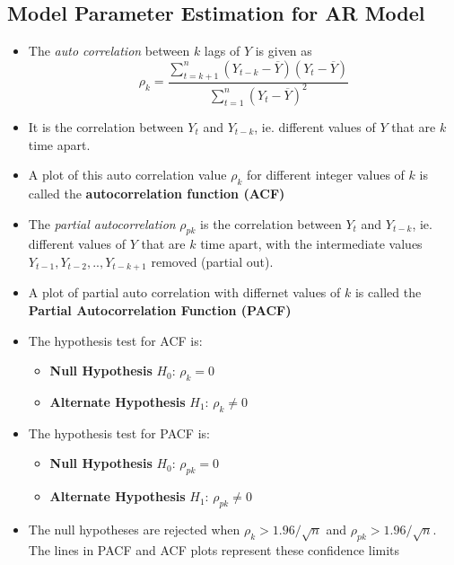 \documentclass{article}
\theoremstyle{plain}
\theoremstyle{definition}
\begin{document}
\subsection{Model Parameter Estimation for AR Model}
\begin{itemize}
    \item The \textit{auto correlation}  between $k$ lags of $Y$ is given as
    \begin{equation*}
        \rho_k = \frac{\sum\limits_{t=k+1}^{n} (Y_{t-k} - \overline{Y})(Y_t - \overline{Y})}{\sum\limits_{t=1}^{n} (Y_t - \overline{Y})^2}
    \end{equation*}
    
    \item It is the correlation between $Y_t$ and $Y_{t-k}$, ie. different values of $Y$ that are $k$ time apart. 
    
    \item A plot of this auto correlation value $\rho_k$ for different integer values of $k$ is called the \textbf{autocorrelation function (ACF)}
    
    \item The \textit{partial autocorrelation} $\rho_{pk}$ is the correlation between $Y_t$ and $Y_{t-k}$, ie. different values of $Y$ that are $k$ time apart, with the intermediate values $Y_{t-1}, Y_{t-2}, .., Y_{t-k+1}$ removed (partial out).
    
    \item A plot of partial auto correlation with differnet values of $k$ is called the \textbf{Partial Autocorrelation Function (PACF)}
    
    \item The hypothesis test for ACF is:
    \begin{itemize}
        \item \textbf{Null Hypothesis} $H_0$: $\rho_k = 0$
        \item \textbf{Alternate Hypothesis} $H_1$: $\rho_k \ne 0$
    \end{itemize}
    
    \item The hypothesis test for PACF is:
    \begin{itemize}
        \item \textbf{Null Hypothesis} $H_0$: $\rho_{pk} = 0$
        \item \textbf{Alternate Hypothesis} $H_1$: $\rho_{pk} \ne 0$
    \end{itemize}
    
    \item The null hypotheses are rejected when $\rho_{k} > 1.96/\sqrt{n}$ and $\rho_{pk} > 1.96/\sqrt{n}$. The lines in PACF and ACF plots represent these confidence limits
    

\end{itemize}
\end{document}
